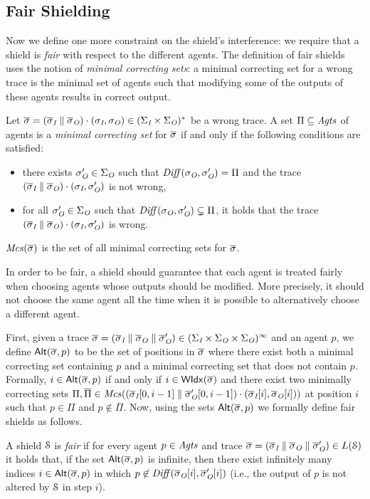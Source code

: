\subsection{Fair Shielding}
Now we define one more constraint on the shield's interference: we require that a shield is \emph{fair} with respect to the different agents.
The definition of fair shields uses the notion of \emph{minimal correcting sets}:
a minimal correcting set for a wrong trace is the minimal set of agents such that modifying some of the outputs of these agents results in correct output.

Let $\overline\sigma  = (\overline\sigma_{\textit{I}}\parallel\overline\sigma_{\textit{O}}) \cdot (\sigma_{\textit{I}},\sigma_{\textit{O}})\in (\Sigma_{\textit{I}} \times \Sigma_{\textit{O}})^*$ be a wrong trace. A set $\Pi \subseteq \mathit{Agts}$ of agents is a \emph{minimal correcting set} for $\overline\sigma$ if and only if the following conditions are satisfied:
\begin{itemize}
\item there exists $\sigma_{\textit{O}}' \in \Sigma_{\textit{O}}$ such that  $\mathit{Diff}(\sigma_{\textit{O}},\sigma_{\textit{O}}') = \Pi$ and the trace $(\overline\sigma_{\textit{I}}\parallel\overline\sigma_{\textit{O}}) \cdot (\sigma_{\textit{I}},\sigma_{\textit{O}}')$ is not wrong,
\item for all $\sigma_{\textit{O}}' \in\Sigma_{\textit{O}}$ such that $\mathit{Diff}(\sigma_{\textit{O}},\sigma_{\textit{O}}') \subsetneq \Pi$, it holds that the trace $(\overline\sigma_{\textit{I}}\parallel\overline\sigma_{\textit{O}}) \cdot (\sigma_{\textit{I}},\sigma_{\textit{O}}')$ is wrong.
\end{itemize}
$\mathit{Mcs}(\overline\sigma)$ is the set of all minimal correcting sets for $\overline\sigma$.

In order to be fair, a shield should guarantee that  each agent is treated fairly when choosing agents whose outputs should be modified. More precisely, it should not choose the same agent  all the time when it is possible to alternatively choose a different agent.

First, given a trace $\overline\sigma = (\overline\sigma_{\textit{I}} \parallel \overline\sigma_{\textit{O}} \parallel \overline\sigma_{\textit{O}}') \in (\Sigma_{\textit{I}} \times \Sigma_{\textit{O}} \times \Sigma_{\textit{O}})^\infty$ and an agent $p$, we define $\mathsf{Alt}(\overline\sigma,p)$ to be the set of positions in $\overline\sigma$ where there exist both a minimal correcting set containing $p$ and a minimal correcting set that does not contain $p$. Formally, $i \in \mathsf{Alt}(\overline\sigma,p)$ if and only if $i \in \mathsf{WIdx}(\overline\sigma)$ and there exist two minimally correcting sets $\Pi ,\overline\Pi\in \mathit{Mcs}((\overline\sigma_{\textit{I}}[0,i-1] \parallel \overline\sigma_{\textit{O}}'[0,i-1])\cdot(\overline\sigma_{\textit{I}}[i],\overline\sigma_{\textit{O}}[i]))$ at position $i$ such that $p \in \Pi$ and $p \not \in \overline\Pi$. Now, using the sets $\mathsf{Alt}(\overline\sigma,p)$ we formally define fair shields as follows.

\begin{defn}\label{defn:fair-shield}
A shield $\mathcal{S}$ is \emph{fair} if for every agent $p \in \mathit{Agts}$ and trace $\overline\sigma = (\overline\sigma_{\textit{I}} \parallel \overline\sigma_{\textit{O}} \parallel \overline\sigma_{\textit{O}}') \in L(\mathcal{S})$ it holds that, if the set $\mathsf{Alt}(\overline\sigma,p)$ is infinite, then there exist infinitely many indices $i \in \mathsf{Alt}(\overline\sigma,p)$ in which $p \not \in \mathit{Diff}(\overline\sigma_{\textit{O}}[i],\overline\sigma_{\textit{O}}'[i])$ (i.e., the output of $p$ is not altered by $\mathcal{S}$ in step $i$).
\end{defn}





